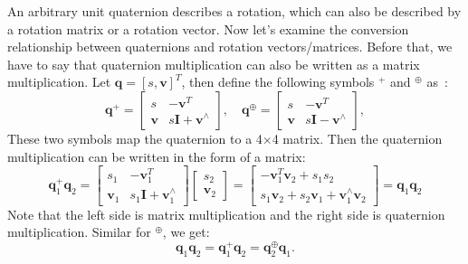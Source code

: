 An arbitrary unit quaternion describes a rotation, which can also be described by a rotation matrix or a rotation vector. Now let's examine the conversion relationship between quaternions and rotation vectors/matrices. Before that, we have to say that quaternion multiplication can also be written as a matrix multiplication. Let $\mathbf{q}=[s,\mathbf{v}]^T$, then define the following symbols $^{+}$ and $^{\oplus}$ as~\cite{Barfoot2011}:
\begin{equation}
	\mathbf{q}^{+}=\left[\begin{array}{cc}
		s&-\mathbf{v}^T \\
		\mathbf{v}&s\mathbf{I}+\mathbf{v}^{\wedge}
	\end{array}\right],\quad
	\mathbf{q}^{\oplus}=
	\left[\begin{array}{cc}
		s & -\mathbf{v}^T \\
		\mathbf{v} & s\mathbf{I}-\mathbf{v}^{\wedge}
	\end{array}\right],
\end{equation}
These two symbols map the quaternion to a 4$\times$4 matrix. Then the quaternion multiplication can be written in the form of a matrix:
\begin{equation}
	\mathbf{q}_1^ + {\mathbf{q}_2} = \left[ {\begin{array}{*{20}{c}}
			s_1&-\mathbf{v}_1^T\\
			\mathbf{v}_1 & s_1 \mathbf{I} + \mathbf{v}_1^\wedge
	\end{array}} \right]\left[ {\begin{array}{*{20}{c}}
			{{s _2}} \\
			{{\mathbf{v} _2}}
	\end{array}} \right] = \left[ {\begin{array}{*{20}{c}}
			{ - \mathbf{v} _1^T{\mathbf{v} _2} + {s _1}{s _2}} \\
			{{s _1}{\mathbf{v} _2} + {s _2}{\mathbf{v} _1} + \mathbf{v} _1^ \wedge {\mathbf{v} _2}}
	\end{array}} \right] = \mathbf{q}_1 \mathbf{q}_2
\end{equation}
Note that the left side is matrix multiplication and the right side is quaternion multiplication. Similar for $^\oplus$, we get:
\begin{equation}
	\mathbf{q}_1 \mathbf{q}_2 = \mathbf{q}_1^{+} \mathbf{q}_2 = \mathbf{q}_2^{\oplus} \mathbf{q}_1.
\end{equation}

